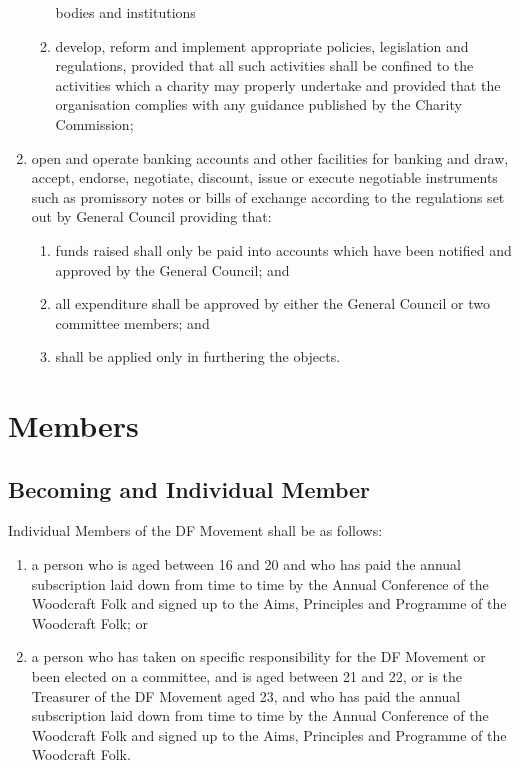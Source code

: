 \documentclass[a4paper, 11pt]{report}
\begin{document}
\begin{enumerate}
\begin{enumerate}
bodies and institutions
\item develop, reform and implement appropriate policies, legislation and regulations, provided that all such activities shall be confined to the activities which a charity may properly undertake and provided that the organisation complies with any guidance published by the Charity Commission;
\end{enumerate}
\item open and operate banking accounts and other facilities for banking and draw,
accept, endorse, negotiate, discount, issue or execute negotiable instruments such
as promissory notes or bills of exchange according to the regulations set out by
General Council providing that:
\begin{enumerate}
\item funds raised shall only be paid into accounts which have been notified and
approved by the General Council; and
\item all expenditure shall be approved by either the General Council or two committee
members; and
\item shall be applied only in furthering the objects.
\end{enumerate}
\end{enumerate}

\section{Members}
\label{sec:members}
\subsection{Becoming and Individual Member}
\label{sec:indivmembers}
Individual Members of the DF Movement shall be as follows:
\begin{enumerate}[\hspace{0.5cm}(a)]
\item \label{item:normalmember} a person who is aged between 16 and 20 and who has paid the annual subscription laid down from time to time by the Annual Conference of the Woodcraft Folk and signed up to the Aims, Principles and Programme of the Woodcraft Folk; or
\item  \label{item:greyarea} a person who has taken on specific responsibility for the DF Movement or been elected on a committee, and is aged between 21 and 22, or is the Treasurer of the DF Movement aged 23, and who has paid the annual subscription laid down from time to time by the Annual Conference of the Woodcraft Folk and signed up to the Aims, Principles and Programme of the Woodcraft Folk.
\end{enumerate}
\end{document}
